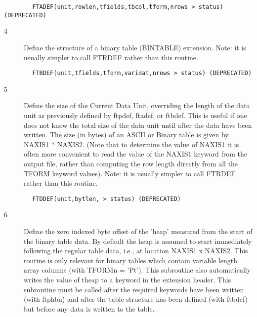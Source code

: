 \documentclass[11pt]{book}
\begin{document}
\begin{verbatim}
        FTADEF(unit,rowlen,tfields,tbcol,tform,nrows > status) (DEPRECATED)
\end{verbatim}

\begin{description}
\item[4 ] Define the structure of a binary table (BINTABLE) extension. Note: it
   is usually simpler to call FTRDEF rather than this routine.
\end{description}

\begin{verbatim}
        FTBDEF(unit,tfields,tform,varidat,nrows > status) (DEPRECATED)
\end{verbatim}

\begin{description}
\item[5 ] Define the size of the Current Data Unit, overriding the length
    of the data unit as previously defined by ftpdef, ftadef, or ftbdef.
    This is useful if one does not know the total size of the data unit until
    after the data have been written.  The size (in bytes) of an ASCII or
    Binary table is given by NAXIS1 * NAXIS2.  (Note that to determine the
    value of NAXIS1 it is often more convenient to read the value of the
    NAXIS1 keyword from the output file, rather than computing the row
    length directly from all the TFORM keyword values).  Note: it
   is usually simpler to call FTRDEF rather than this routine.
\end{description}

\begin{verbatim}
        FTDDEF(unit,bytlen, > status) (DEPRECATED)
\end{verbatim}

\begin{description}
\item[6 ] Define the zero indexed byte offset of the 'heap' measured from
    the start of the binary table data.  By default the heap is assumed
    to start immediately following the regular table data, i.e., at
    location NAXIS1 x NAXIS2.  This routine is only relevant for
    binary tables which contain variable length array columns (with
    TFORMn = 'Pt').  This subroutine also automatically writes
    the value of theap to a keyword in the extension header.  This
    subroutine must be called after the required keywords have been
    written (with ftphbn) and after the table structure has been defined
   (with ftbdef) but before any data is written to the table.
\end{description}
\end{document}
